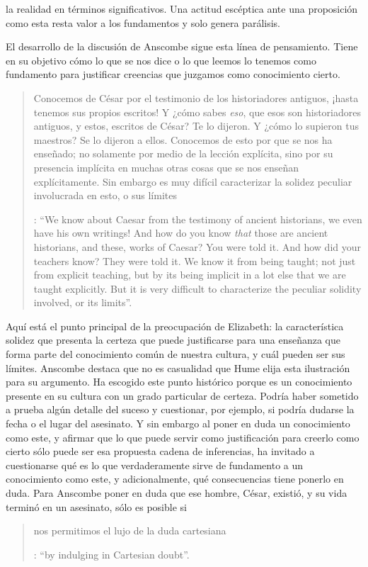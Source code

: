 la realidad en términos significativos. Una actitud escéptica ante una proposición como esta resta valor a los fundamentos y solo genera parálisis.

El desarrollo de la discusión de Anscombe sigue esta línea de pensamiento. Tiene en su objetivo cómo lo que se nos dice o lo que leemos lo tenemos como fundamento para justificar creencias que juzgamos como conocimiento cierto.

\blockquote[{\Cite[90]{anscombe1981parmenides:humeandjulius}}: \enquote{We know about Caesar from the testimony of ancient historians, we even have his own writings! And how do you know \emph{that} those are ancient historians, and these, works of Caesar? You were told it. And how did your teachers know? They were told it. We know it from being taught; not just from explicit teaching, but by its being implicit in a lot else that we are taught explicitly. But it is very difficult to characterize the peculiar solidity involved, or its limits}.]{Conocemos de César por el testimonio de los historiadores antiguos, ¡hasta tenemos sus propios escritos! Y ¿cómo sabes \emph{eso}, que esos son historiadores antiguos, y estos, escritos de César? Te lo dijeron. Y ¿cómo lo supieron tus maestros? Se lo dijeron a ellos. Conocemos de esto por que se nos ha enseñado; no solamente por medio de la lección explícita, sino por su presencia implícita en muchas otras cosas que se nos enseñan explícitamente. Sin embargo es muy difícil caracterizar la solidez peculiar involucrada en esto, o sus límites}. Aquí está el punto principal de la preocupación de Elizabeth: la característica solidez que presenta la certeza que puede justificarse para una enseñanza que forma parte del conocimiento común de nuestra cultura, y cuál pueden ser sus límites. Anscombe destaca que no es casualidad que Hume elija esta ilustración para su argumento. Ha escogido este punto histórico porque es un conocimiento presente en su cultura con un grado particular de certeza. Podría haber sometido a prueba algún detalle del suceso y cuestionar, por ejemplo, si podría dudarse la fecha o el lugar del asesinato. Y sin embargo al poner en duda un conocimiento como este, y afirmar que lo que puede servir como justificación para creerlo como cierto sólo puede ser esa propuesta cadena de inferencias, ha invitado a cuestionarse qué es lo que verdaderamente sirve de fundamento a un conocimiento como este, y adicionalmente, qué consecuencias tiene ponerlo en duda. Para Anscombe poner en duda que ese hombre, César, existió, y su vida terminó en un asesinato, sólo es posible si \blockquote[{\Cite[Cf.][90]{anscombe1981parmenides:humeandjulius}}: \enquote{by indulging in Cartesian doubt}.]{nos permitimos el lujo de la duda cartesiana}.

